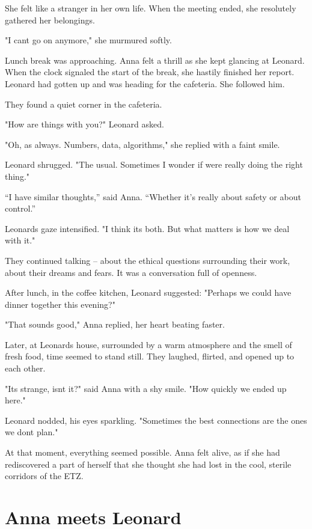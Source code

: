 \documentclass[
]{article}
\begin{document}
She felt like a stranger in her own life. When the meeting ended, she resolutely gathered her belongings.

"I can\textquotesingle t go on anymore," she murmured softly.

Lunch break was approaching. Anna felt a thrill as she kept glancing at Leonard. When the clock signaled the start of the break, she hastily finished her report. Leonard had gotten up and was heading for the cafeteria. She followed him.

They found a quiet corner in the cafeteria.

"How are things with you?" Leonard asked.

"Oh, as always. Numbers, data, algorithms," she replied with a faint smile.

Leonard shrugged. "The usual. Sometimes I wonder if we\textquotesingle re really doing the right thing."

``I have similar thoughts,'' said Anna. ``Whether it's really about safety or about control.''

Leonard\textquotesingle s gaze intensified. "I think it\textquotesingle s both. But what matters is how we deal with it."

They continued talking -- about the ethical questions surrounding their work, about their dreams and fears. It was a conversation full of openness.

After lunch, in the coffee kitchen, Leonard suggested: "Perhaps we could have dinner together this evening?"

"That sounds good," Anna replied, her heart beating faster.

Later, at Leonard\textquotesingle s house, surrounded by a warm atmosphere and the smell of fresh food, time seemed to stand still. They laughed, flirted, and opened up to each other.

"It\textquotesingle s strange, isn\textquotesingle t it?" said Anna with a shy smile. "How quickly we ended up here."

Leonard nodded, his eyes sparkling. "Sometimes the best connections are the ones we don\textquotesingle t plan."

At that moment, everything seemed possible. Anna felt alive, as if she had rediscovered a part of herself that she thought she had lost in the cool, sterile corridors of the ETZ.

\section{Anna meets Leonard}\label{anna-meets-leonard}
\end{document}

